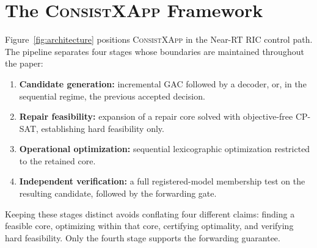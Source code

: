 \documentclass[pdflatex,sn-mathphys-num,iicol,oneside]{sn-jnl}
\newcommand{\method}{\textsc{ConsistXApp}\xspace}
\newcommand{\gac}{\textsc{GAC}\xspace}
\newcommand{\cpsat}{\textsc{CP-SAT}\xspace}
\begin{document}
\section{The \method Framework}
\label{sec:method}

Figure~\ref{fig:architecture} positions \method in the Near-RT RIC
control path. The pipeline separates four stages whose boundaries are
maintained throughout the paper:

\begin{enumerate}[label=\arabic*.,leftmargin=1.6em]
\item \textbf{Candidate generation:} incremental \gac followed by a
decoder, or, in the sequential regime, the previous accepted
decision.
\item \textbf{Repair feasibility:} expansion of a repair core solved
with objective-free \cpsat, establishing hard feasibility only.
\item \textbf{Operational optimization:} sequential lexicographic
optimization restricted to the retained core.
\item \textbf{Independent verification:} a full registered-model
membership test on the resulting candidate, followed by the
forwarding gate.
\end{enumerate}

Keeping these stages distinct avoids conflating four different
claims: finding a feasible core, optimizing within that core,
certifying optimality, and verifying hard feasibility. Only the
fourth stage supports the forwarding guarantee.
\end{document}
